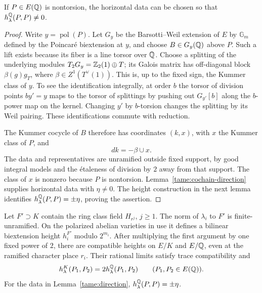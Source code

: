 \begin{lemma}\label{tame:direction}
If \(P\in E(\mathbb Q)\) is nontorsion, the horizontal data can be chosen so
that \(h_\lambda^\mathbb Q(P,P)\ne0\).
\end{lemma}

\begin{proof}
Write \(y=\operatorname{pol}(P)\). Let \(G_y\) be the Barsotti--Weil
extension of \(E\) by \(\mathbb G_m\) defined by the Poincaré biextension
at \(y\), and choose \(B\in G_y(\mathbb Q)\) above \(P\). Such a lift exists
because its fiber is a line torsor over \(\mathbb Q\).
Choose a splitting of the underlying modules
\(T_2G_y=\mathbb Z_2(1)\oplus T\); its Galois matrix has off-diagonal block
\(\beta(g)g_T\), where \(\beta\in Z^1(T^\vee(1))\).
This is, up to the fixed sign, the Kummer class of \(y\). To see the
identification integrally, at order \(b\) the torsor of division points
\(by'=y\) maps to the torsor of splittings by pushing out
\(G_{y'}[b]\) along the \(b\)-power map on the kernel. Changing \(y'\)
by \(b\)-torsion changes the splitting by its Weil pairing. These
identifications commute with reduction.

The Kummer cocycle of \(B\) therefore has coordinates \((k,x)\), with
\(x\) the Kummer class of \(P\), and
\begin{equation}\label{tame:biextension-cocycle}
 dk=-\beta\cup x.
\end{equation}
The data and representatives are unramified outside fixed support,
by good integral models and the étaleness of division by \(2\) away
from that support. The class of \(x\) is nonzero because \(P\) is
nontorsion. Lemma~\ref{tame:cochain-direction} supplies horizontal
data with \(\eta\ne0\). The height construction in the next lemma
identifies \(h_\lambda^\mathbb Q(P,P)=\pm\eta\), proving the assertion.
\end{proof}

\begin{lemma}\label{tame:heights}
Let \(F'\supset K\) contain the ring class field \(H_{r^j}\), \(j\ge1\).
The norm of \(\lambda_i\) to \(F'\) is finite-unramified. On the
polarized abelian varieties in use it defines a bilinear
biextension height \(h_i^{F'}\) modulo \(2^{m_i}\).
After multiplying the first argument by one fixed power of \(2\),
there are compatible heights on \(E/K\) and \(E/\mathbb Q\), even at the
ramified character place \(r_i\). Their rational limits satisfy
trace compatibility and
\[
 h_\lambda^K(P_1,P_2)=2h_\lambda^\mathbb Q(P_1,P_2)
 \qquad(P_1,P_2\in E(\mathbb Q)).
\]
For the data in Lemma~\ref{tame:direction},
\(h_\lambda^\mathbb Q(P,P)=\pm\eta\).
\end{lemma}

